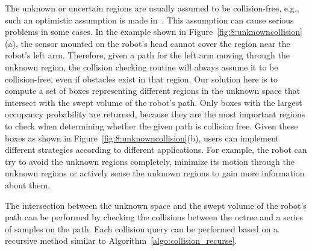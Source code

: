 The unknown or uncertain regions are usually assumed to be
collision-free, e.g., such an optimistic assumption is made
in~\cite{Rusu:RPG:2009}. This assumption can cause serious problems in some
cases. In the example shown in Figure~\ref{fig:8:unknowncollision}(a), the sensor
mounted on the robot's head cannot cover the region near the robot's
left arm. Therefore, given a path for the left arm moving
through the unknown region, the collision checking routine will always
assume it to be collision-free, even if obstacles exist in that
region. Our solution here is to compute a set of
boxes representing different regions in the unknown space that
intersect with the swept volume of the robot's path. Only boxes
with the largest occupancy probability are returned, because they are
the most important regions to check when determining whether the given path is
collision free. Given these boxes as shown in Figure~\ref{fig:8:unknowncollision}(b), users can implement different
strategies according to different applications. For example, the robot
can try to avoid the unknown regions completely, minimize its motion
through the unknown regions or actively sense the unknown regions to
gain more information about them.

The intersection between the unknown space and the swept volume of the
robot's path can be performed by checking the collisions between
the octree and a series of samples on the path. Each collision
query can be performed based on a recursive method similar to Algorithm~\ref{algo:collision_recurse}. %

